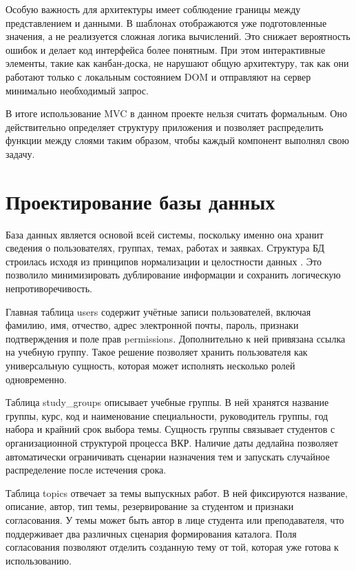 \documentclass[14pt,a4paper]{extreport}
\begin{document}
Особую важность для архитектуры имеет соблюдение границы между
представлением и данными.
В шаблонах отображаются уже подготовленные значения, а не реализуется
сложная логика вычислений.
Это снижает вероятность ошибок и делает код интерфейса более понятным.
При этом интерактивные элементы, такие как канбан-доска, не нарушают общую
архитектуру, так как они работают только с локальным состоянием DOM и
отправляют на сервер минимально необходимый запрос.

В итоге использование MVC в данном проекте нельзя считать формальным.
Оно действительно определяет структуру приложения и позволяет распределить
функции между слоями таким образом, чтобы каждый компонент выполнял свою
задачу.

\section{Проектирование базы данных}

База данных является основой всей системы, поскольку именно она хранит
сведения о пользователях, группах, темах, работах и заявках.
Структура БД строилась исходя из принципов нормализации и целостности данных
\cite{date}.
Это позволило минимизировать дублирование информации и сохранить логическую
непротиворечивость.

Главная таблица users содержит учётные записи пользователей, включая
фамилию, имя, отчество, адрес электронной почты, пароль, признаки
подтверждения и поле прав permissions.
Дополнительно к ней привязана ссылка на учебную группу.
Такое решение позволяет хранить пользователя как универсальную сущность,
которая может исполнять несколько ролей одновременно.

Таблица study\_groups описывает учебные группы.
В ней хранятся название группы, курс, код и наименование специальности,
руководитель группы, год набора и крайний срок выбора темы.
Сущность группы связывает студентов с организационной структурой процесса
ВКР.
Наличие даты дедлайна позволяет автоматически ограничивать сценарии
назначения тем и запускать случайное распределение после истечения срока.

Таблица topics отвечает за темы выпускных работ.
В ней фиксируются название, описание, автор, тип темы, резервирование за
студентом и признаки согласования.
У темы может быть автор в лице студента или преподавателя, что поддерживает
два различных сценария формирования каталога.
Поля согласования позволяют отделить созданную тему от той, которая уже
готова к использованию.
\end{document}
